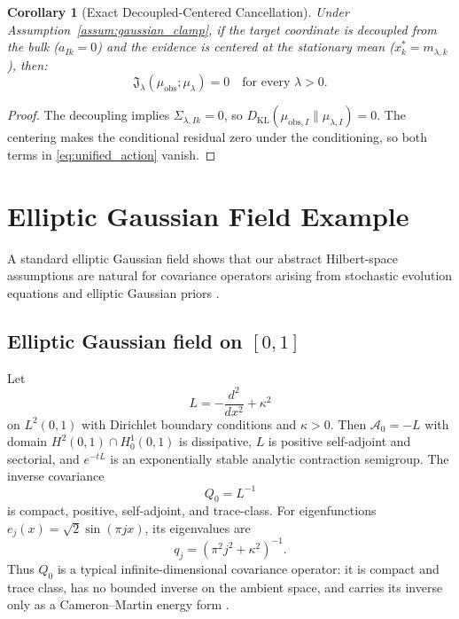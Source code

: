 \documentclass[preprint,12pt]{elsarticle}
\theoremstyle{plain}
\newtheorem{corollary}[theorem]{Corollary}
\theoremstyle{definition}
\theoremstyle{remark}
\newcommand{\KL}{D_{\operatorname{KL}}}
\begin{document}
    \begin{corollary}[Exact Decoupled-Centered Cancellation]
        \label{cor:exact_pole_zero}
        Under Assumption~\ref{assum:gaussian_clamp}, if the target coordinate is decoupled from the bulk ($a_{Ik} = 0$) and the evidence is centered at the stationary mean ($x_k^* = m_{\lambda,k}$), then:
        \begin{equation}
            \mathfrak{J}_\lambda(\mu_{\mathrm{obs}}; \mu_\lambda) = 0 \quad \text{for every } \lambda > 0.
        \end{equation}
    \end{corollary}
    \begin{proof}
        The decoupling implies $\Sigma_{\lambda,Ik} = 0$, so $\KL(\mu_{\text{obs},I} \parallel \mu_{\lambda,I}) = 0$. The centering makes the conditional residual zero under the conditioning, so both terms in \eqref{eq:unified_action} vanish.
    \end{proof}

    \section{Elliptic Gaussian Field Example}
    \label{sec:spde}

    A standard elliptic Gaussian field shows that our abstract Hilbert-space assumptions are natural for covariance operators arising from stochastic evolution equations and elliptic Gaussian priors \cite{daprato2014stochastic,lord2014introduction,stuart2010inverse,henderson2022sobolev}.

    \subsection{Elliptic Gaussian field on \texorpdfstring{$[0,1]$}{[0,1]}}

    Let
    \[
    L=-\frac{d^2}{dx^2}+\kappa^2
    \]
    on $L^2(0,1)$ with Dirichlet boundary conditions and $\kappa>0$. Then $\mathcal{A}_0=-L$ with domain $H^2(0,1)\cap H_0^1(0,1)$ is dissipative, $L$ is positive self-adjoint and sectorial, and $e^{-tL}$ is an exponentially stable analytic contraction semigroup. The inverse covariance
    \[
    Q_0=L^{-1}
    \]
    is compact, positive, self-adjoint, and trace-class. For eigenfunctions $e_j(x)=\sqrt{2}\sin(\pi jx)$, its eigenvalues are
    \[
    q_j=(\pi^2j^2+\kappa^2)^{-1}.
    \]
    Thus $Q_0$ is a typical infinite-dimensional covariance operator: it is compact and trace class, has no bounded inverse on the ambient space, and carries its inverse only as a Cameron--Martin energy form \cite{bogachev1998gaussian,simon2005trace,henderson2022sobolev}.
\end{document}
